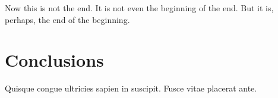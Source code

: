 

\begin{savequote}[50mm]
Now this is not the end. It is not even the beginning of the end. But it is, perhaps, the end of the beginning. 
\end{savequote}


\chapter{Conclusions}
\label{cha:conclusions}

\ifpdf
    \graphicspath{{5_conclusion/figures/PNG/}{5_conclusion/figures/PDF/}{5_conclusion/figures/}}
\else
    \graphicspath{{5_conclusion/figures/EPS/}{5_conclusion/figures/}}
\fi



Quisque congue ultricies sapien in suscipit. Fusce vitae placerat ante.



